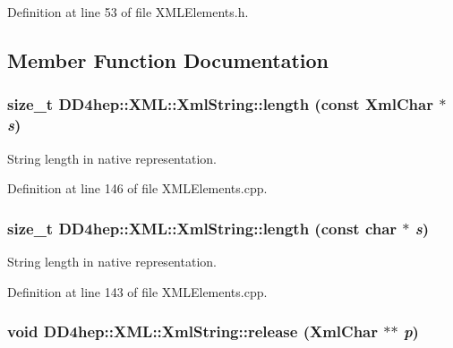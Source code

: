 Definition at line 53 of file XMLElements.h.

\subsection{Member Function Documentation}
\hypertarget{class_d_d4hep_1_1_x_m_l_1_1_xml_string_a71fddc08af6472ad59d6314ae371bd94}{
\subsubsection[{length}]{\setlength{\rightskip}{0pt plus 5cm}size\_\-t DD4hep::XML::XmlString::length (const {\bf XmlChar} $\ast$ {\em s})}}
\label{class_d_d4hep_1_1_x_m_l_1_1_xml_string_a71fddc08af6472ad59d6314ae371bd94}


String length in native representation. 

Definition at line 146 of file XMLElements.cpp.\hypertarget{class_d_d4hep_1_1_x_m_l_1_1_xml_string_aa4237a8d0f89aa98c8322ca4893c2b74}{
\subsubsection[{length}]{\setlength{\rightskip}{0pt plus 5cm}size\_\-t DD4hep::XML::XmlString::length (const char $\ast$ {\em s})}}
\label{class_d_d4hep_1_1_x_m_l_1_1_xml_string_aa4237a8d0f89aa98c8322ca4893c2b74}


String length in native representation. 

Definition at line 143 of file XMLElements.cpp.\hypertarget{class_d_d4hep_1_1_x_m_l_1_1_xml_string_a24b46d6226ea149ece81a30761176c7c}{
\subsubsection[{release}]{\setlength{\rightskip}{0pt plus 5cm}void DD4hep::XML::XmlString::release ({\bf XmlChar} $\ast$$\ast$ {\em p})}}
\label{class_d_d4hep_1_1_x_m_l_1_1_xml_string_a24b46d6226ea149ece81a30761176c7c}



